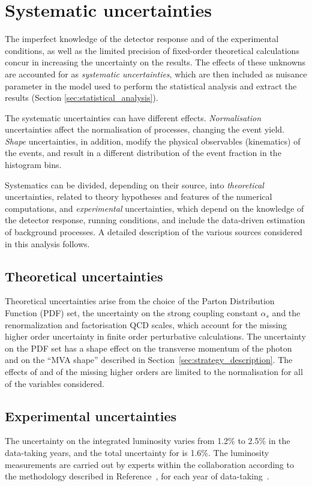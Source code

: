 \section{Systematic uncertainties}
\label{sec:systematics}
The imperfect knowledge of the detector response and of the experimental conditions, as well as the limited precision of fixed-order theoretical calculations concur in increasing the uncertainty on the results.
The effects of these unknowns are accounted for as \textit{systematic uncertainties}, which are then included as nuisance parameter in the model used to perform the statistical analysis and extract the results (Section \ref{sec:statistical_analysis}).

The systematic uncertainties can have different effects.
\textit{Normalisation} uncertainties affect the normalisation of processes, changing the event yield.
\textit{Shape} uncertainties, in addition, modify the physical observables (\eg kinematics) of the events, and result in a different distribution of the event fraction in the histogram bins.

Systematics can be divided, depending on their source, into \textit{theoretical} uncertainties, related to theory hypotheses and features of the numerical computations, and \textit{experimental} uncertainties, which depend on the knowledge of the detector response, running conditions, and include the data-driven estimation of background processes.
A detailed description of the various sources considered in this analysis follows.

\subsection{Theoretical uncertainties}
Theoretical uncertainties arise from the choice of the Parton Distribution Function (PDF) set,
the uncertainty on the strong coupling constant $\alpha_s$ and
the renormalization and factorisation QCD scales, which account for the missing higher order uncertainty in finite order perturbative calculations.
The uncertainty on the PDF set has a shape effect on the transverse momentum of the photon
and on the ``MVA shape'' described in Section~\ref{sec:strategy_description}.
The effects of \alpS and of the missing higher orders are limited to the normalisation for all of the variables considered.

\subsection{Experimental uncertainties}
The uncertainty on the integrated luminosity varies from 1.2\usep\% to 2.5\usep\% in the data-taking years, and the total uncertainty for \RunII{} is 1.6\usep\%.
The luminosity measurements are carried out by experts within the collaboration according to the methodology described in Reference~\cite{CMS:LUM-17-003},
for each year of data-taking~\cite{CMS:LUM-17-004, CMS:LUM-18-002}.

